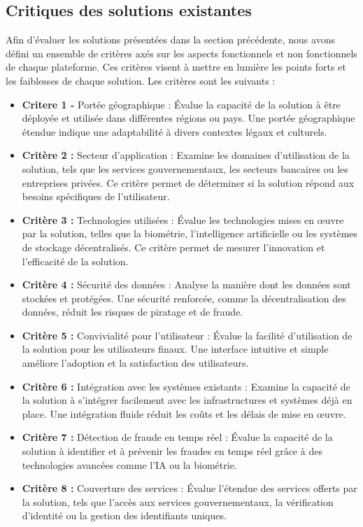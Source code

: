 \subsection{Critiques des solutions existantes}
Afin d'évaluer les solutions présentées dans la section précédente, nous avons défini un ensemble de critères axés sur les aspects fonctionnels et non fonctionnels de chaque plateforme. Ces critères visent à mettre en lumière les points forts et les faiblesses de chaque solution. Les critères sont les suivants :
\begin{itemize}[label=\textbullet]

\item \textbf{Critere 1 -} Portée géographique  :  Évalue la capacité de la solution à être déployée et utilisée dans différentes régions ou pays. Une portée géographique étendue indique une adaptabilité à divers contextes légaux et culturels.

   
\item \textbf{ Critère 2 :  }  Secteur d'application :  Examine les domaines d'utilisation de la solution, tels que les services gouvernementaux, les secteurs bancaires ou les entreprises privées. Ce critère permet de déterminer si la solution répond aux besoins spécifiques de l'utilisateur.

\item \textbf{ Critère 3 :  }  Technologies utilisées :  Évalue les technologies mises en œuvre par la solution, telles que la biométrie, l'intelligence artificielle ou les systèmes de stockage décentralisés. Ce critère permet de mesurer l'innovation et l'efficacité de la solution.

\item \textbf{ Critère 4 :  }  Sécurité des données :  Analyse la manière dont les données sont stockées et protégées. Une sécurité renforcée, comme la décentralisation des données, réduit les risques de piratage et de fraude.

\item \textbf{ Critère 5 :  }  Convivialité pour l'utilisateur :  Évalue la facilité d'utilisation de la solution pour les utilisateurs finaux. Une interface intuitive et simple améliore l'adoption et la satisfaction des utilisateurs.

\item \textbf{ Critère 6 :  }  Intégration avec les systèmes existants :  Examine la capacité de la solution à s'intégrer facilement avec les infrastructures et systèmes déjà en place. Une intégration fluide réduit les coûts et les délais de mise en œuvre.

\item \textbf{ Critère 7 :  }  Détection de fraude en temps réel :  Évalue la capacité de la solution à identifier et à prévenir les fraudes en temps réel grâce à des technologies avancées comme l'IA ou la biométrie.

\item \textbf{ Critère 8 :  }  Couverture des services :  Évalue l'étendue des services offerts par la solution, tels que l'accès aux services gouvernementaux, la vérification d'identité ou la gestion des identifiants uniques.
   \end{itemize}
